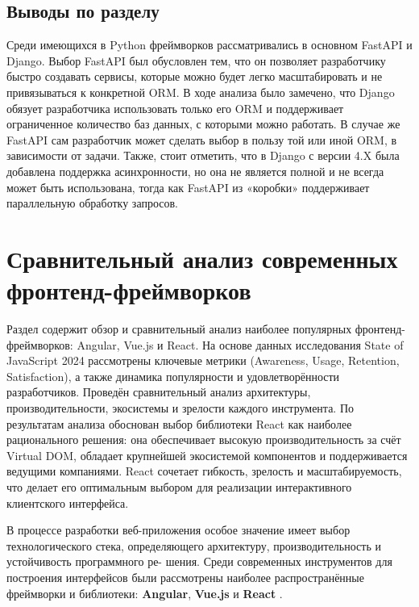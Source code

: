 \subsection{Выводы по разделу}
Среди имеющихся в Python фреймворков рассматривались в основном FastAPI
и Django. Выбор FastAPI был обусловлен тем, что он позволяет разработчику быстро создавать
сервисы, которые можно будет легко масштабировать и не привязываться к конкретной
ORM. В ходе анализа было замечено, что Django обязует разработчика использовать только
его ORM и поддерживает ограниченное количество баз данных, с которыми можно работать.
В случае же FastAPI сам разработчик может сделать выбор в пользу той или иной ORM, в
зависимости от задачи. Также, стоит отметить, что в Django с версии 4.X была добавлена
поддержка асинхронности, но она не является полной и не всегда может быть использована,
тогда как FastAPI из «коробки» поддерживает параллельную обработку запросов. \cite{fastapi-best-practices,fastapi-bill}
			

\section{Сравнительный анализ современных фронтенд-фреймворков}
\begin{annotation}
	Раздел содержит обзор и сравнительный анализ наиболее популярных фронтенд-
	фреймворков: Angular, Vue.js и React. На основе данных исследования State of JavaScript 2024
	рассмотрены ключевые метрики (Awareness, Usage, Retention, Satisfaction), а также динамика
	популярности и удовлетворённости разработчиков. Проведён сравнительный анализ
	архитектуры, производительности, экосистемы и зрелости каждого инструмента. По результатам
	анализа обоснован выбор библиотеки React как наиболее рационального решения: 
	она обеспечивает высокую производительность за счёт Virtual DOM, обладает крупнейшей 
	экосистемой компонентов и поддерживается ведущими компаниями. React сочетает 
	гибкость, зрелость и масштабируемость, что делает его оптимальным выбором для
	реализации интерактивного клиентского интерфейса.
\end{annotation}

В процессе разработки веб-приложения особое значение имеет выбор технологического
стека, определяющего архитектуру, производительность и устойчивость программного ре-
шения. Среди современных инструментов для построения интерфейсов были рассмотрены
наиболее распространённые фреймворки и библиотеки: \textbf{Angular}, \textbf{Vue.js} и \textbf{React} \cite{state-of-javascript, indonesian}.

